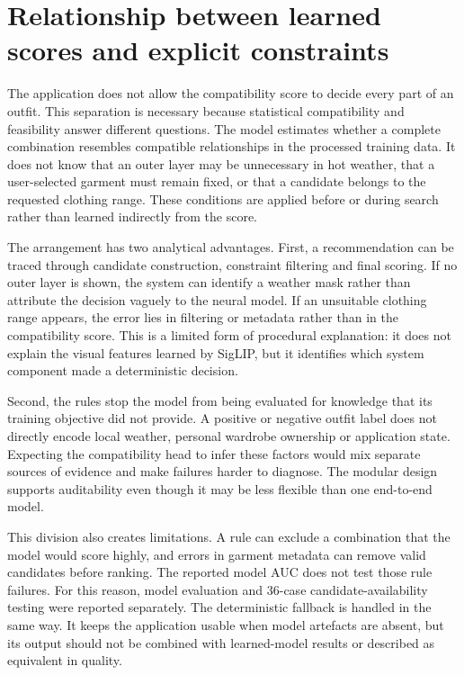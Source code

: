 \section{Relationship between learned scores and explicit constraints}

The application does not allow the compatibility score to decide every part of
an outfit. This separation is necessary because statistical compatibility and
feasibility answer different questions. The model estimates whether a complete
combination resembles compatible relationships in the processed training data.
It does not know that an outer layer may be unnecessary in hot weather, that a
user-selected garment must remain fixed, or that a candidate belongs to the
requested clothing range. These conditions are applied before or during search
rather than learned indirectly from the score.

The arrangement has two analytical advantages. First, a recommendation can be
traced through candidate construction, constraint filtering and final scoring.
If no outer layer is shown, the system can identify a weather mask rather than
attribute the decision vaguely to the neural model. If an unsuitable clothing
range appears, the error lies in filtering or metadata rather than in the
compatibility score. This is a limited form of procedural explanation: it does
not explain the visual features learned by SigLIP, but it identifies which
system component made a deterministic decision.

Second, the rules stop the model from being evaluated for knowledge that its
training objective did not provide. A positive or negative outfit label does
not directly encode local weather, personal wardrobe ownership or application
state. Expecting the compatibility head to infer these factors would mix
separate sources of evidence and make failures harder to diagnose. The modular
design supports auditability even though it may be less flexible
than one end-to-end model.

This division also creates limitations. A rule can exclude a combination that
the model would score highly, and errors in garment metadata can remove valid
candidates before ranking. The reported model AUC does not test those rule
failures. For this reason, model evaluation and 36-case candidate-availability
testing were reported separately. The deterministic fallback is handled in the
same way. It keeps the application usable when model artefacts are absent, but
its output should not be combined with learned-model results or described as
equivalent in quality.

